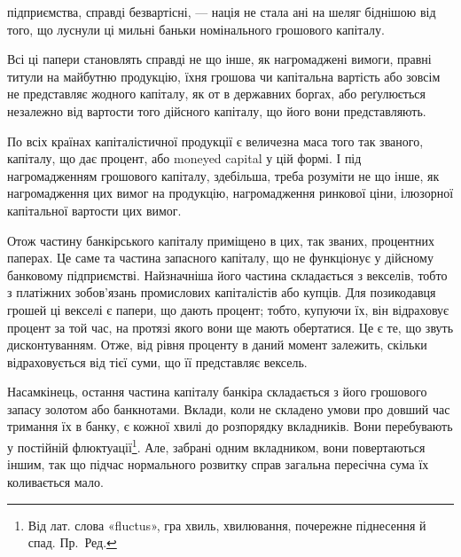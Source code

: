 \parcont{}  %
підприємства, справді безвартісні, — нація не стала ані на шеляг біднішою
від того, що луснули ці мильні баньки номінального грошового капіталу.

Всі ці папери становлять справді не що інше, як нагромаджені вимоги,
правні титули на майбутню продукцію, їхня грошова чи капітальна вартість
або зовсім не представляє жодного капіталу, як от в державних боргах, або
реґулюється незалежно від вартости того дійсного капіталу, що його вони представляють.

По всіх країнах капіталістичної продукції є величезна маса того так званого,
капіталу, що дає процент, або moneyed capital у цій формі. І під нагромадженням
грошового капіталу, здебільша, треба розуміти не що інше, як нагромадження
цих вимог на продукцію, нагромадження ринкової ціни, ілюзорної
капітальної вартости цих вимог.

Отож частину банкірського капіталу приміщено в цих, так званих, процентних
паперах. Це саме та частина запасного капіталу, що не функціонує
у дійсному банковому підприємстві. Найзначніша його частина складається з
векселів, тобто з платіжних зобов’язань промислових капіталістів або купців.
Для позикодавця грошей ці векселі є папери, що дають процент; тобто, купуючи
їх, він відраховує процент за той час, на протязі якого вони ще мають обертатися.
Це є те, що звуть дисконтуванням. Отже, від рівня проценту в даний момент
залежить, скільки відраховується від тієї суми, що її представляє вексель.

Насамкінець, остання частина капіталу банкіра складається з його грошового
запасу золотом або банкнотами. Вклади, коли не складено умови про
довший час тримання їх в банку, є кожної хвилі до розпорядку вкладників.
Вони перебувають у постійній флюктуації\footnote*{
Від лат. слова «fluctus», гра хвиль, хвилювання, почережне піднесення й спад. Пр.~Ред.
}. Але, забрані одним вкладником, вони
повертаються іншим, так що підчас нормального розвитку справ загальна пересічна
сума їх коливається мало.

